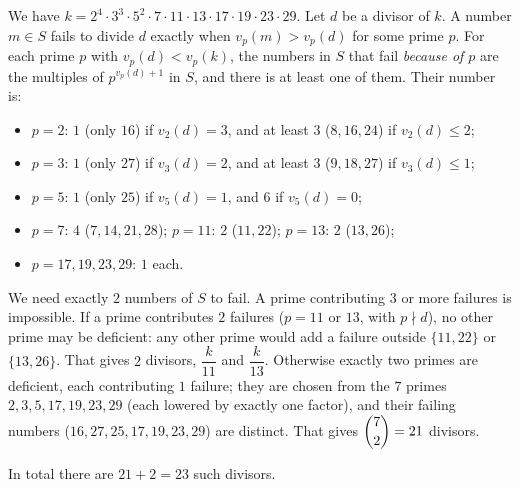 We have $k=2^4\cdot3^3\cdot5^2\cdot7\cdot11\cdot13\cdot17\cdot19\cdot23\cdot29$. Let $d$ be a divisor of $k$. A number $m\in S$ fails to divide $d$ exactly when $v_p(m)>v_p(d)$ for some prime $p$. For each prime $p$ with $v_p(d)<v_p(k)$, the numbers in $S$ that fail \emph{because of $p$} are the multiples of $p^{v_p(d)+1}$ in $S$, and there is at least one of them. Their number is:
\begin{itemize}
\item $p=2$: $1$ (only $16$) if $v_2(d)=3$, and at least $3$ ($8,16,24$) if $v_2(d)\le2$;
\item $p=3$: $1$ (only $27$) if $v_3(d)=2$, and at least $3$ ($9,18,27$) if $v_3(d)\le1$;
\item $p=5$: $1$ (only $25$) if $v_5(d)=1$, and $6$ if $v_5(d)=0$;
\item $p=7$: $4$ ($7,14,21,28$); $p=11$: $2$ ($11,22$); $p=13$: $2$ ($13,26$);
\item $p=17,19,23,29$: $1$ each.
\end{itemize}
We need exactly $2$ numbers of $S$ to fail. A prime contributing $3$ or more failures is impossible. If a prime contributes $2$ failures ($p=11$ or $13$, with $p\nmid d$), no other prime may be deficient: any other prime would add a failure outside $\{11,22\}$ or $\{13,26\}$. That gives $2$ divisors, $\dfrac{k}{11}$ and $\dfrac{k}{13}$. Otherwise exactly two primes are deficient, each contributing $1$ failure; they are chosen from the $7$ primes $2,3,5,17,19,23,29$ (each lowered by exactly one factor), and their failing numbers ($16,27,25,17,19,23,29$) are distinct. That gives $\dbinom72=21$ divisors.

In total there are $21+2=\boxed{23}$ such divisors.
